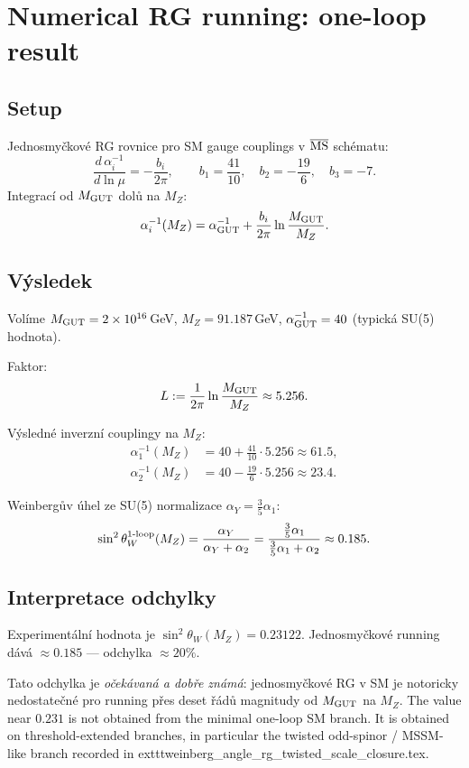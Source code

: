 \documentclass[12pt,a4paper]{article}
\begin{document}
\section{Numerical RG running: one-loop result}
\label{sec:rg-numerical}

\subsection{Setup}

Jednosmyčkové RG rovnice pro SM gauge couplings v $\overline{\rm MS}$
schématu:
\[
\frac{d\,\alpha_i^{-1}}{d\ln\mu}
= -\frac{b_i}{2\pi},
\qquad b_1 = \frac{41}{10},\quad b_2 = -\frac{19}{6},
\quad b_3 = -7.
\]
Integrací od $M_{\rm GUT}$ dolů na $M_Z$:
\[
\alpha_i^{-1}(M_Z)
= \alpha_{\rm GUT}^{-1} + \frac{b_i}{2\pi}\ln\frac{M_{\rm GUT}}{M_Z}.
\]

\subsection{Výsledek}

Volíme $M_{\rm GUT}=2\times10^{16}$\,GeV, $M_Z=91.187$\,GeV,
$\alpha_{\rm GUT}^{-1}=40$ (typická SU(5) hodnota).

Faktor:
\[
L := \frac{1}{2\pi}\ln\frac{M_{\rm GUT}}{M_Z} \approx 5.256.
\]

Výsledné inverzní couplingy na $M_Z$:
\begin{align}
\alpha_1^{-1}(M_Z) &= 40 + \tfrac{41}{10}\cdot 5.256 \approx 61.5,\\
\alpha_2^{-1}(M_Z) &= 40 - \tfrac{19}{6}\cdot 5.256 \approx 23.4.
\end{align}

Weinbergův úhel ze SU(5) normalizace $\alpha_Y = \tfrac{3}{5}\alpha_1$:
\[
\sin^2\theta_W^{\rm 1\text{-}loop}(M_Z)
= \frac{\alpha_Y}{\alpha_Y + \alpha_2}
= \frac{\tfrac{3}{5}\alpha_1}{\tfrac{3}{5}\alpha_1 + \alpha_2}
\approx 0.185.
\]

\subsection{Interpretace odchylky}

Experimentální hodnota je $\sin^2\theta_W(M_Z)=0.23122$.
Jednosmyčkové running dává $\approx0.185$ — odchylka $\approx20\%$.

Tato odchylka je \emph{očekávaná a dobře známá}:
jednosmyčkové RG v SM je notoricky nedostatečné pro running
přes deset řádů magnitudy od $M_{\rm GUT}$ na $M_Z$.
The value near $0.231$ is not obtained from the minimal one-loop SM branch.
It is obtained on threshold-extended branches, in particular the twisted
odd-spinor / MSSM-like branch recorded in
	exttt{weinberg\_angle\_rg\_twisted\_scale\_closure.tex}.
\end{document}
